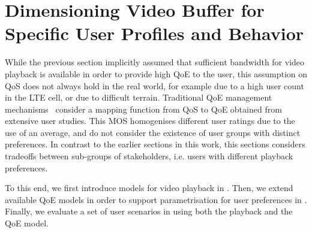 \section{Dimensioning Video Buffer for Specific User Profiles and Behavior}\label{sec:application:qoe_user_behaviour}

\newcommand{\stallingRatio}{\ensuremath{R}\xspace}
\newcommand{\stallingDuration}{\ensuremath{L}\xspace}
\newcommand{\numberStallingEvents}{\ensuremath{N^*}\xspace}
\newcommand{\stallingFrequency}{\ensuremath{F}\xspace}
\newcommand{\meanStallingEventDuration}{\ensuremath{L}\xspace}

\newcommand{\networkBandwidth}{\ensuremath{\lambda}\xspace}
\newcommand{\playbackRate}{\ensuremath{\mu}\xspace}

\newcommand{\meanBusy}{\ensuremath{B}\xspace}
\newcommand{\meanIdle}{\ensuremath{L}\xspace}
\newcommand{\numberFrames}{\ensuremath{Z}\xspace}
\newcommand{\videoDownloadTime}{\ensuremath{t_Z}\xspace}

\newcommand{\watchLater}{\emph{Watch Later}\xspace}
\newcommand{\watchNow}{\emph{Watch Now}\xspace}
\newcommand{\videoBrowsing}{\emph{Video Browsing}\xspace}

While the previous section implicitly assumed that sufficient bandwidth for video playback is available in order to provide high \gls{QoE} to the user, this assumption on \gls{QoS} does not always hold in the real world, for example due to a high user count in the \gls{LTE} cell, or due to difficult terrain.
Traditional \gls{QoE} management mechanisms~\cite{Hossfeld2013c} consider a mapping function from \gls{QoS} to \gls{QoE} obtained from extensive user studies.
This \gls{MOS} homogenises different user ratings due to the use of an average, and do not consider the existence of user groups with distinct preferences.
In contrast to the earlier sections in this work, this sections considers tradeoffs between sub-groups of stakeholders, i.e. users with different playback preferences.

To this end, we first introduce models for video playback in .
Then, we extend available \gls{QoE} models in order to support parametrisation for user preferences in .
Finally, we evaluate a set of user scenarios in  using both the playback and the \gls{QoE} model.



